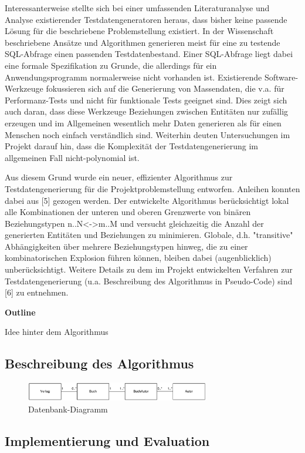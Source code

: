 Interessanterweise stellte sich bei einer umfassenden Literaturanalyse und Analyse existierender Testdatengeneratoren heraus, dass bisher keine passende Lösung für die beschriebene Problemstellung existiert. In der Wissenschaft beschriebene Ansätze und Algorithmen generieren meist für eine zu testende SQL-Abfrage einen passenden Testdatenbestand. Einer SQL-Abfrage liegt dabei eine formale Spezifikation zu Grunde, die allerdings für ein Anwendungsprogramm normalerweise nicht vorhanden ist. Existierende Software-Werkzeuge fokussieren sich auf die Generierung von Massendaten, die v.a. für Performanz-Tests und nicht für funktionale Tests geeignet sind. Dies zeigt sich auch daran, dass diese Werkzeuge Beziehungen zwischen Entitäten nur zufällig erzeugen und im Allgemeinen wesentlich mehr Daten generieren als für einen Menschen noch einfach verständlich sind. Weiterhin deuten Untersuchungen im Projekt darauf hin, dass die Komplexität der Testdatengenerierung im allgemeinen Fall nicht-polynomial ist.

Aus diesem Grund wurde ein neuer, effizienter Algorithmus zur Testdatengenerierung für die Projektproblemstellung entworfen. Anleihen konnten dabei aus [5] gezogen werden. Der entwickelte Algorithmus berücksichtigt lokal alle Kombinationen der unteren und oberen Grenzwerte von binären Beziehungstypen n..N<->m..M und versucht gleichzeitig die Anzahl der generierten Entitäten und Beziehungen zu minimieren. Globale, d.h. "transitive" Abhängigkeiten über mehrere Beziehungstypen hinweg, die zu einer kombinatorischen Explosion führen können, bleiben dabei (augenblicklich) unberücksichtigt. Weitere Details zu dem im Projekt entwickelten Verfahren zur Testdatengenerierung (u.a. Beschreibung des Algorithmus in Pseudo-Code) sind [6] zu entnehmen.

%



\textbf{Outline}

Idee hinter dem Algorithmus

	\subsection{Beschreibung des Algorithmus}

	\begin{figure}[htb]
		\begin{center}
			\includegraphics[width=8cm]{images/database.png}
			\caption{\label{database}Datenbank-Diagramm}
		\end{center}
	\end{figure}
	

	

	\subsection{Implementierung und Evaluation}

